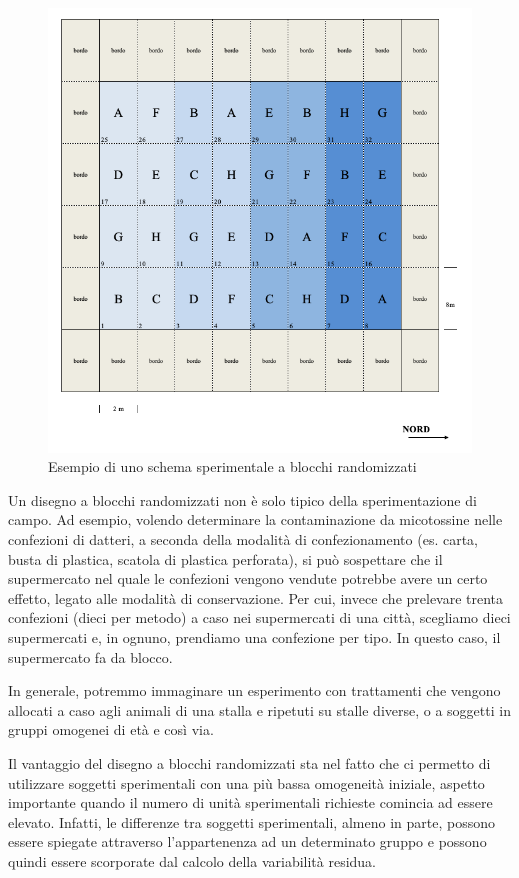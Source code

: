 \documentclass[a4paper,12pt,oneside]{book}
\begin{document}
\begin{figure}

{\centering \includegraphics[width=0.9\linewidth]{_images/Mappa1CRBD} 

}

\caption{Esempio di uno schema sperimentale a blocchi randomizzati}\label{fig:figName34}
\end{figure}

Un disegno a blocchi randomizzati non è solo tipico della sperimentazione di campo. Ad esempio, volendo determinare la contaminazione da micotossine nelle confezioni di datteri, a seconda della modalità di confezionamento (es. carta, busta di plastica, scatola di plastica perforata), si può sospettare che il supermercato nel quale le confezioni vengono vendute potrebbe avere un certo effetto, legato alle modalità di conservazione. Per cui, invece che prelevare trenta confezioni (dieci per metodo) a caso nei supermercati di una città, scegliamo dieci supermercati e, in ognuno, prendiamo una confezione per tipo. In questo caso, il supermercato fa da blocco.

In generale, potremmo immaginare un esperimento con trattamenti che vengono allocati a caso agli animali di una stalla e ripetuti su stalle diverse, o a soggetti in gruppi omogenei di età e così via.

Il vantaggio del disegno a blocchi randomizzati sta nel fatto che ci permetto di utilizzare soggetti sperimentali con una più bassa omogeneità iniziale, aspetto importante quando il numero di unità sperimentali richieste comincia ad essere elevato. Infatti, le differenze tra soggetti sperimentali, almeno in parte, possono essere spiegate attraverso l'appartenenza ad un determinato gruppo e possono quindi essere scorporate dal calcolo della variabilità residua.
\end{document}
